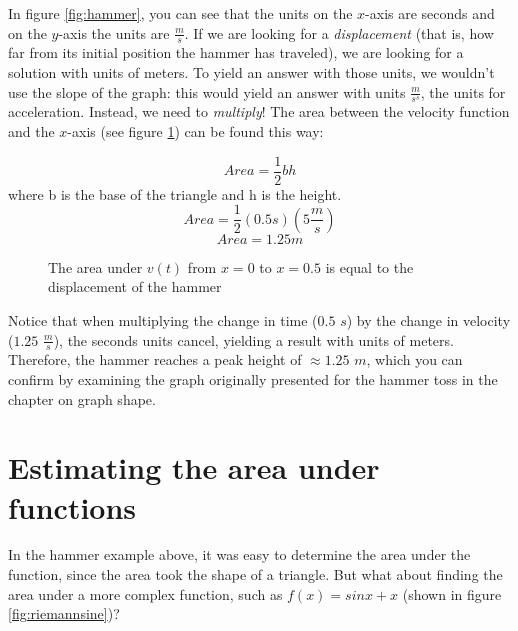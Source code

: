 In figure \ref{fig:hammer}, you can see that the units on the $x$-axis are seconds and on the $y$-axis the units are $\frac{m}{s}$. If we are looking for a \textit{displacement} (that is, how far from its initial position the hammer has traveled), we are looking for a solution with units of meters. To yield an answer with those units, we wouldn't use the slope of the graph: this would yield an answer with units $\frac{m}{s^s}$, the units for acceleration. Instead, we need to \textit{multiply}! The area between the velocity function and the $x$-axis (see figure \ref{fig:hammerarea}) can be found this way:

$$Area=\frac{1}{2}bh$$where b is the base of the triangle and h is the height. 
$$Area=\frac{1}{2}(0.5s)(5\frac{m}{s})$$
$$Area=1.25m$$


\begin{figure}[htbp]
	\centering
	\caption{The area under $v(t)$ from $x=0$ to $x=0.5$ is equal to the displacement of the hammer}
	\label{fig:hammerarea}
\end{figure}

Notice that when multiplying the change in time ($0.5$ $s$) by the change in velocity ($1.25$ $\frac{m}{s}$), the seconds units cancel, yielding a result with units of meters. Therefore, the hammer reaches a peak height of $\approx1.25$ $m$, which you can confirm by examining the graph originally presented for the hammer toss in the chapter on graph shape.



\section{Estimating the area under functions}

In the hammer example above, it was easy to determine the area under the function, since the area took the shape of a triangle. But what about finding the area under a more complex function, such as $f(x) = sin{x}+x$ (shown in figure \ref{fig:riemannsine})?


